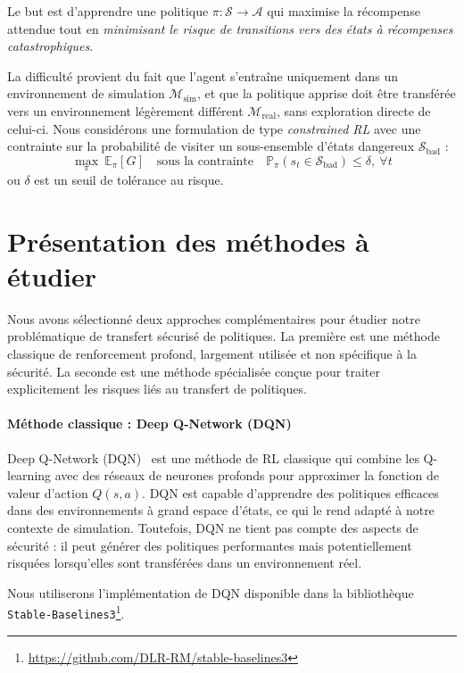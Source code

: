 \documentclass{article}
\begin{document}
Le but est d’apprendre une politique $\pi: \mathcal{S} \to \mathcal{A}$ qui maximise la récompense attendue tout en \textit{minimisant le risque de transitions vers des états à récompenses catastrophiques}.

La difficulté provient du fait que l’agent s'entraîne uniquement dans un environnement de simulation $\mathcal{M}_{\text{sim}}$, et que la politique apprise doit être transférée vers un environnement légèrement différent $\mathcal{M}_{\text{real}}$, sans exploration directe de celui-ci. Nous considérons une formulation de type \textit{constrained RL} avec une contrainte sur la probabilité de visiter un sous-ensemble d’états dangereux $\mathcal{S}_{\text{bad}}$ :
\[
\max_{\pi} \ \mathbb{E}_{\pi}[G] \quad \text{sous la contrainte} \quad \mathbb{P}_{\pi}(s_t \in \mathcal{S}_{\text{bad}}) \leq \delta, \ \forall t
\]
ou $\delta$ est un seuil de tolérance au risque.

\section*{Présentation des méthodes à étudier}

Nous avons sélectionné deux approches complémentaires pour étudier notre problématique de transfert sécurisé de politiques. La première est une méthode classique de renforcement profond, largement utilisée et non spécifique à la sécurité. La seconde est une méthode spécialisée conçue pour traiter explicitement les risques liés au transfert de politiques.

\paragraph{Méthode classique : Deep Q-Network (DQN)}
Deep Q-Network (DQN)~\cite{mnih2015human} est une méthode de RL classique qui combine les Q-learning avec des réseaux de neurones profonds pour approximer la fonction de valeur d’action $Q(s,a)$. DQN est capable d’apprendre des politiques efficaces dans des environnements à grand espace d’états, ce qui le rend adapté à notre contexte de simulation. Toutefois, DQN ne tient pas compte des aspects de sécurité : il peut générer des politiques performantes mais potentiellement risquées lorsqu’elles sont transférées dans un environnement réel.

Nous utiliserons l’implémentation de DQN disponible dans la bibliothèque \texttt{Stable-Baselines3}\footnote{\url{https://github.com/DLR-RM/stable-baselines3}}.
\end{document}
